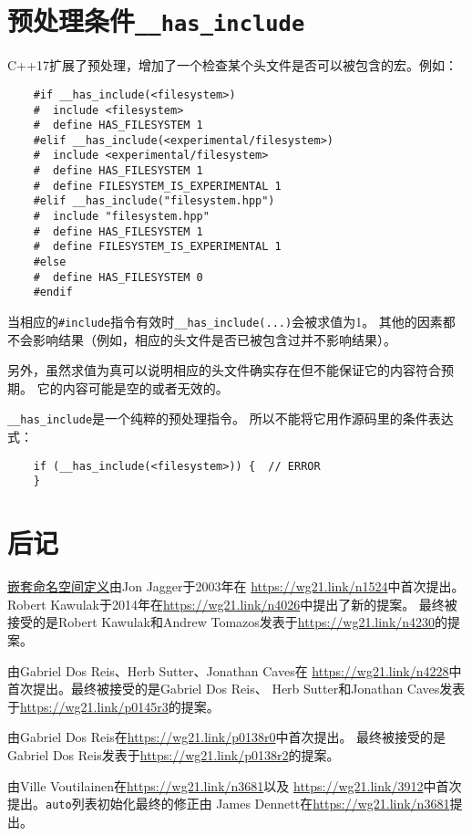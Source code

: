 \section{预处理条件\texttt{\_\_has\_include}}\label{ch8.9}
C++17扩展了预处理，增加了一个检查某个头文件是否可以被包含的宏。例如：
\begin{lstlisting}
    #if __has_include(<filesystem>)
    #  include <filesystem>
    #  define HAS_FILESYSTEM 1
    #elif __has_include(<experimental/filesystem>)
    #  include <experimental/filesystem>
    #  define HAS_FILESYSTEM 1
    #  define FILESYSTEM_IS_EXPERIMENTAL 1
    #elif __has_include("filesystem.hpp")
    #  include "filesystem.hpp"
    #  define HAS_FILESYSTEM 1
    #  define FILESYSTEM_IS_EXPERIMENTAL 1
    #else
    #  define HAS_FILESYSTEM 0
    #endif
\end{lstlisting}
当相应的\texttt{\#include}指令有效时\texttt{\_\_has\_include(...)}会被求值为1。
其他的因素都不会影响结果（例如，相应的头文件是否已被包含过并不影响结果）。

另外，虽然求值为真可以说明相应的头文件确实存在但不能保证它的内容符合预期。
它的内容可能是空的或者无效的。

\texttt{\_\_has\_include}是一个纯粹的预处理指令。
所以不能将它用作源码里的条件表达式：
\begin{lstlisting}
    if (__has_include(<filesystem>)) {  // ERROR
    }
\end{lstlisting}

\section{后记}
\hyperref[ch8.1]{嵌套命名空间定义}由Jon Jagger于2003年在
\url{https://wg21.link/n1524}中首次提出。
Robert Kawulak于2014年在\url{https://wg21.link/n4026}中提出了新的提案。
最终被接受的是Robert Kawulak和Andrew Tomazos发表于\url{https://wg21.link/n4230}的提案。

由Gabriel Dos Reis、Herb Sutter、Jonathan Caves在
\url{https://wg21.link/n4228}中首次提出。最终被接受的是Gabriel Dos Reis、
Herb Sutter和Jonathan Caves发表于\url{https://wg21.link/p0145r3}的提案。

由Gabriel Dos Reis在\url{https://wg21.link/p0138r0}中首次提出。
最终被接受的是Gabriel Dos Reis发表于\url{https://wg21.link/p0138r2}的提案。

由Ville Voutilainen在\url{https://wg21.link/n3681}以及
\url{https://wg21.link/3912}中首次提出。\texttt{auto}列表初始化最终的修正由
James Dennett在\url{https://wg21.link/n3681}提出。

